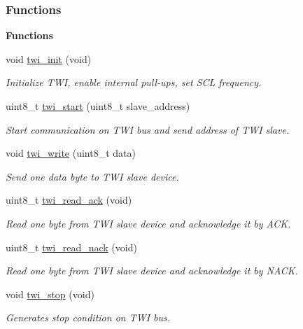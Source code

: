 \subsubsection*{Functions}
\begin{Indent}{\bf Functions}\par
\begin{DoxyCompactItemize}
\item 
void \hyperlink{a00008_ga16f0e6b2fa5a26eadbf4086ab6d54467}{twi\+\_\+init} (void)
\begin{DoxyCompactList}\small\item\em Initialize T\+WI, enable internal pull-\/ups, set S\+CL frequency. \end{DoxyCompactList}\item 
uint8\+\_\+t \hyperlink{a00008_ga36b3c950a1804f75057a870afdf81d55}{twi\+\_\+start} (uint8\+\_\+t slave\+\_\+address)
\begin{DoxyCompactList}\small\item\em Start communication on T\+WI bus and send address of T\+WI slave. \end{DoxyCompactList}\item 
void \hyperlink{a00008_gab45679e1a7b3b8f97b636d825e7d14f7}{twi\+\_\+write} (uint8\+\_\+t data)
\begin{DoxyCompactList}\small\item\em Send one data byte to T\+WI slave device. \end{DoxyCompactList}\item 
uint8\+\_\+t \hyperlink{a00008_ga7a2cd23dea30ee2c99c1ccffb3402d79}{twi\+\_\+read\+\_\+ack} (void)
\begin{DoxyCompactList}\small\item\em Read one byte from T\+WI slave device and acknowledge it by A\+CK. \end{DoxyCompactList}\item 
uint8\+\_\+t \hyperlink{a00008_gaa21e972557bab9a799720874660cf152}{twi\+\_\+read\+\_\+nack} (void)
\begin{DoxyCompactList}\small\item\em Read one byte from T\+WI slave device and acknowledge it by N\+A\+CK. \end{DoxyCompactList}\item 
void \hyperlink{a00008_gacf52d6c93df110dee6d402b389e5042e}{twi\+\_\+stop} (void)
\begin{DoxyCompactList}\small\item\em Generates stop condition on T\+WI bus. \end{DoxyCompactList}\end{DoxyCompactItemize}
\end{Indent}
